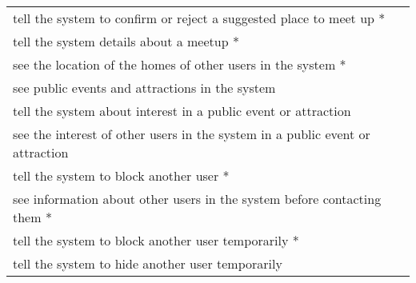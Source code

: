 \begin{longtable}{p{}}
tell the system to confirm or reject a suggested place to meet up  * \\
tell the system details about a meetup  * \\
see the location of the homes of other users in the system  * \\
see public events and attractions in the system \\
tell the system about interest in a public event or attraction \\
see the interest of other users in the system in a public event or attraction \\
tell the system to block another user * \\
see information about other users in the system before contacting them  * \\
tell the system to block another user temporarily * \\
tell the system to hide another user temporarily \\
\end{longtable}
